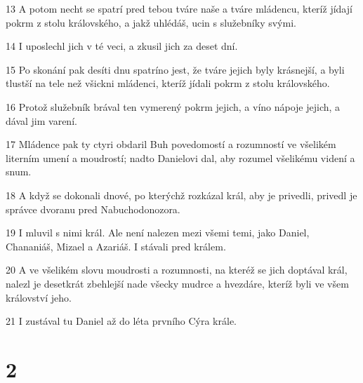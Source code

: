 \par 13 A potom necht se spatrí pred tebou tváre naše a tváre mládencu, kteríž jídají pokrm z stolu královského, a jakž uhlédáš, ucin s služebníky svými.
\par 14 I uposlechl jich v té veci, a zkusil jich za deset dní.
\par 15 Po skonání pak desíti dnu spatríno jest, že tváre jejich byly krásnejší, a byli tlustší na tele než všickni mládenci, kteríž jídali pokrm z stolu královského.
\par 16 Protož služebník brával ten vymerený pokrm jejich, a víno nápoje jejich, a dával jim varení.
\par 17 Mládence pak ty ctyri obdaril Buh povedomostí a rozumností ve všelikém literním umení a moudrostí; nadto Danielovi dal, aby rozumel všelikému videní a snum.
\par 18 A když se dokonali dnové, po kterýchž rozkázal král, aby je privedli, privedl je správce dvoranu pred Nabuchodonozora.
\par 19 I mluvil s nimi král. Ale není nalezen mezi všemi temi, jako Daniel, Chananiáš, Mizael a Azariáš. I stávali pred králem.
\par 20 A ve všelikém slovu moudrosti a rozumnosti, na kteréž se jich doptával král, nalezl je desetkrát zbehlejší nade všecky mudrce a hvezdáre, kteríž byli ve všem království jeho.
\par 21 I zustával tu Daniel až do léta prvního Cýra krále.

\chapter{2}

